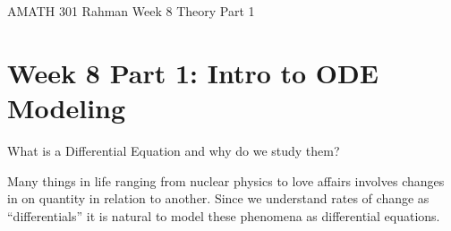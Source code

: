 \documentclass[reqno]{amsart}
\theoremstyle{definition}
\begin{document}
\begin{flushleft}
{\sc \Large AMATH 301 Rahman} \hfill Week 8 Theory Part 1
\bigskip
\end{flushleft}

\newcommand{\R}{\mathbb{R}}
\newcommand{\N}{\mathbb{N}}
\newcommand{\Z}{\mathbb{Z}}
\newcommand{\Q}{\mathbb{Q}}
\renewcommand{\CancelColor}{\color{red}}
\newcommand{\?}{\stackrel{?}{=}}
\renewcommand{\varphi}{\phi}
\newcommand{\card}{\text{Card}}
\newcommand{\bigzero}{\text{\Huge 0}}
\newcommand{\curvearrowdown}{{\color{red}\rotatebox{90}{$\curvearrowleft$}}}
\newcommand{\curvearrowup}{{\color{red}\rotatebox{90}{$\curvearrowright$}}}



\section*{Week 8 Part 1:  Intro to ODE Modeling}

What is a Differential Equation and why do we study them?

Many things in life ranging from nuclear physics to love affairs involves changes in on quantity in relation to another.  Since
we understand rates of change as ``differentials'' it is natural to model these phenomena as differential equations.
\end{document}
